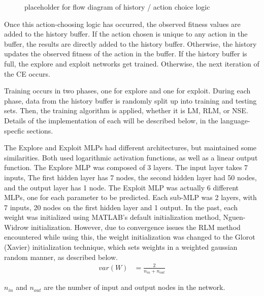 \begin{figure}
\caption{placeholder for flow diagram of history / action choice logic}
\end{figure}
\par Once this action-choosing logic has occurred, the observed fitness values are added to the history buffer. If the action chosen is unique to any action in the buffer, the results are directly added to the history buffer. Otherwise, the history updates the observed fitness of the action in the buffer. If the history buffer is full, the explore and exploit networks get trained. Otherwise, the next iteration of the CE occurs.
\par Training occurs in two phases, one for explore and one for exploit. During each phase, data from the history buffer is randomly split up into training and testing sets. Then, the training algorithm is applied, whether it is LM, RLM, or NSE. Details of the implementation of each will be described below, in the language-specfic sections. 
\par The Explore and Exploit MLPs had different architectures, but maintained some similarities. Both used logarithmic activation functions, as well as a linear output function. The Explore MLP was composed of 3 layers. The input layer takes 7 inputs, The first hidden layer has 7 nodes, the second hidden layer had 50 nodes, and the output layer has 1 node. The Exploit MLP was actually 6 different MLPs, one for each parameter to be predicted. Each sub-MLP was 2 layers, with 7  inputs, 20 nodes on the first hidden layer and 1 output. In the past, each weight was initialized using MATLAB's default initialization method, Nguen-Widrow initialization. However, due to convergence issues the RLM method encountered while using this, the weight initialization was changed to the Glorot (Xavier) initialization technique\cite{placeholder_glorotInit}, which sets weights in a weighted gaussian random manner, as described below.
\begin{align*}
	var(W) &= \frac{2}{n_{in}+n_{out}}
\end{align*} 
\par $n_{in}$ and $n_{out}$ are the number of input and output nodes in the network.
